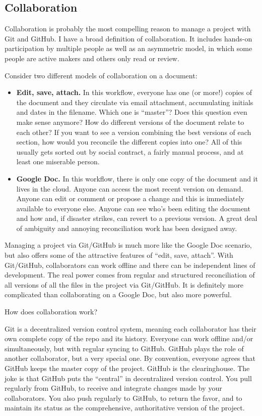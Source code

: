 \documentclass[12pt]{article}
\begin{document}
\subsection{Collaboration}\label{collaboration}

Collaboration is probably the most compelling reason to manage a project
with Git and GitHub. I have a broad definition of collaboration. It
includes hands-on participation by multiple people as well as an
asymmetric model, in which some people are active makers and others only
read or review.

Consider two different models of collaboration on a document:

\begin{itemize}
\item
  \textbf{Edit, save, attach.} In this workflow, everyone has one (or
  more!) copies of the document and they circulate via email attachment,
  accumulating initials and dates in the filename. Which one is
  ``master''? Does this question even make sense anymore? How do
  different versions of the document relate to each other? If you want
  to see a version combining the best versions of each section, how
  would you reconcile the different copies into one? All of this usually
  gets sorted out by social contract, a fairly manual process, and at
  least one miserable person.
\item
  \textbf{Google Doc.} In this workflow, there is only one copy of the
  document and it lives in the cloud. Anyone can access the most recent
  version on demand. Anyone can edit or comment or propose a change and
  this is immediately available to everyone else. Anyone can see who's
  been editing the document and how and, if disaster strikes, can revert
  to a previous version. A great deal of ambiguity and annoying
  reconciliation work has been designed away.
\end{itemize}

Managing a project via Git/GitHub is much more like the Google Doc
scenario, but also offers some of the attractive features of ``edit,
save, attach''. With Git/GitHub, collaborators can work offline and
there can be independent lines of development. The real power comes from
regular and structured reconciliation of all versions of all the files
in the project via Git/GitHub. It is definitely more complicated than
collaborating on a Google Doc, but also more powerful.

How does collaboration work?

Git is a decentralized version control system, meaning each collaborator
has their own complete copy of the repo and its history. Everyone can
work offline and/or simultaneously, but with regular syncing to GitHub.
GitHub plays the role of another collaborator, but a very special one.
By convention, everyone agrees that GitHub keeps the master copy of the
project. GitHub is the clearinghouse. The joke is that GitHub puts the
``central'' in decentralized version control. You pull regularly from
GitHub, to receive and integrate changes made by your collaborators. You
also push regularly to GitHub, to return the favor, and to maintain its
status as the comprehensive, authoritative version of the project.
\end{document}
